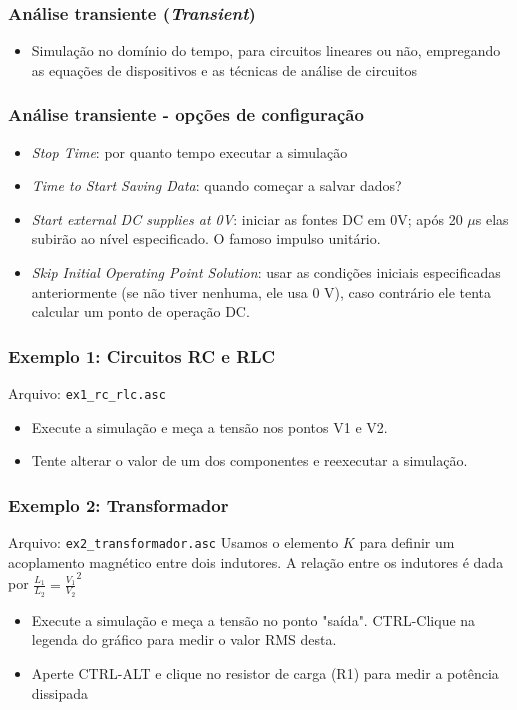 \documentclass{beamer}
\begin{document}
\begin{frame}
\frametitle{Análise transiente (\textit{Transient})}
\begin{itemize}
\item{Simulação no domínio do tempo, para circuitos lineares ou não, empregando as equações de dispositivos e as técnicas de análise de circuitos}
\end{itemize}
\end{frame}

\begin{frame}
\frametitle{Análise transiente - opções de configuração}
\begin{itemize} 
\item \textit{Stop Time}: por quanto tempo executar a simulação
\item \textit{Time to Start Saving Data}: quando começar a salvar dados?
\item \textit{Start external DC supplies at 0V}: iniciar as fontes DC em 0V; após 20 $\mu$s elas subirão ao nível especificado. O famoso impulso unitário.
\item \textit{Skip Initial Operating Point Solution}: usar as condições iniciais especificadas anteriormente (se não tiver nenhuma, ele usa 0 V), caso contrário ele tenta calcular um ponto de operação DC.
\end{itemize}
\end{frame}

\begin{frame}
\frametitle{Exemplo 1: Circuitos RC e RLC}
Arquivo: \texttt{ex1\_rc\_rlc.asc}
\begin{itemize}
\item{Execute a simulação e meça a tensão nos pontos V1 e V2.}
\item{Tente alterar o valor de um dos componentes e reexecutar a simulação.}
\end{itemize}
\end{frame}

\begin{frame}
\frametitle{Exemplo 2: Transformador}
Arquivo: \texttt{ex2\_transformador.asc}
Usamos o elemento $K$ para definir um acoplamento magnético entre dois indutores. 
A relação entre os indutores é dada por $\frac{L_1}{L_2} = \frac{V_1}{V_2}^2$
\begin{itemize}
\item{Execute a simulação e meça a tensão no ponto "saída". CTRL-Clique na legenda do gráfico para medir o valor RMS desta}.
\item{Aperte CTRL-ALT e clique no resistor de carga (R1) para medir a potência dissipada}
\end{itemize}
\end{frame}
\end{document}
